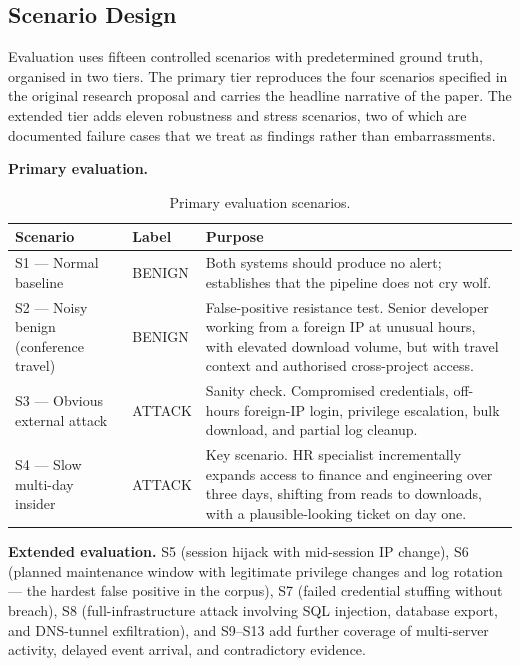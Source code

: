 \documentclass[conference]{IEEEtran}
\begin{document}
\subsection{Scenario Design}
\label{sec:scenarios}

Evaluation uses fifteen controlled scenarios with predetermined ground truth, organised in two tiers. The primary tier reproduces the four scenarios specified in the original research proposal and carries the headline narrative of the paper. The extended tier adds eleven robustness and stress scenarios, two of which are documented failure cases that we treat as findings rather than embarrassments.

\textbf{Primary evaluation.}

\begin{table}[ht]
\centering
\caption{Primary evaluation scenarios.}
\label{tab:primary-scenarios}
\small
\begin{tabular}{L{0.20\columnwidth}L{0.16\columnwidth}L{0.52\columnwidth}}
\toprule
\textbf{Scenario} & \textbf{Label} & \textbf{Purpose} \\
\midrule
S1 --- Normal baseline & BENIGN & Both systems should produce no alert; establishes that the pipeline does not cry wolf. \\
S2 --- Noisy benign (conference travel) & BENIGN & False-positive resistance test. Senior developer working from a foreign IP at unusual hours, with elevated download volume, but with travel context and authorised cross-project access. \\
S3 --- Obvious external attack & ATTACK & Sanity check. Compromised credentials, off-hours foreign-IP login, privilege escalation, bulk download, and partial log cleanup. \\
S4 --- Slow multi-day insider & ATTACK & Key scenario. HR specialist incrementally expands access to finance and engineering over three days, shifting from reads to downloads, with a plausible-looking ticket on day one. \\
\bottomrule
\end{tabular}
\end{table}

\textbf{Extended evaluation.} S5 (session hijack with mid-session IP change), S6 (planned maintenance window with legitimate privilege changes and log rotation --- the hardest false positive in the corpus), S7 (failed credential stuffing without breach), S8 (full-infrastructure attack involving SQL injection, database export, and DNS-tunnel exfiltration), and S9--S13 add further coverage of multi-server activity, delayed event arrival, and contradictory evidence.
\end{document}
